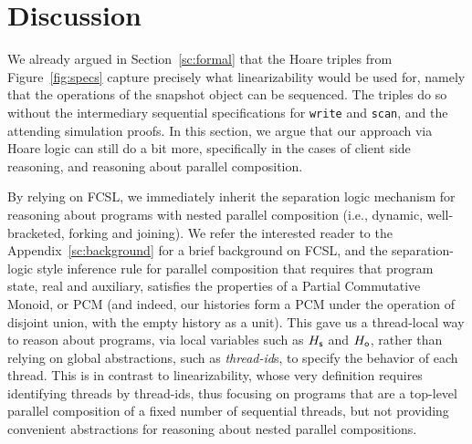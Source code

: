 \section{Discussion}
\label{sec:clients}


We already argued in Section~\ref{sc:formal} that the Hoare triples
from Figure~\ref{fig:specs} capture precisely what linearizability
would be used for, namely that the operations of the snapshot object
can be sequenced. The triples do so without the intermediary
sequential specifications for {\tt write} and {\tt scan}, and the
attending simulation proofs.  In this section, we argue that our
approach via Hoare logic can still do a bit more, specifically in the
cases of client side reasoning, and reasoning about parallel
composition.

By relying on FCSL, we immediately inherit the separation logic
mechanism for reasoning about programs with nested parallel
composition (i.e., dynamic, well-bracketed, forking and joining). We
refer the interested reader to the Appendix~\ref{sc:background} for a
brief background on FCSL, and the separation-logic style inference
rule for parallel composition that requires that program state, real
and auxiliary, satisfies the properties of a Partial Commutative
Monoid, or PCM (and indeed, our histories form a PCM under the
operation of disjoint union, with the empty history as a unit). This
gave us a thread-local way to reason about programs, via local
variables such as $H_{\mathsf{s}}$ and $H_{\mathsf{o}}$, rather than relying on global
abstractions, such as \emph{thread-id}s, to specify the behavior of
each thread.  This is in contrast to linearizability, whose very
definition requires identifying threads by thread-ids, thus focusing
on programs that are a top-level parallel composition of a fixed
number of sequential threads, but not providing convenient
abstractions for reasoning about nested parallel compositions.

